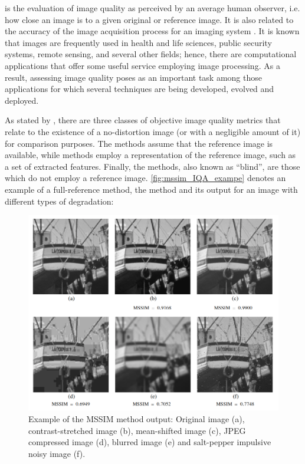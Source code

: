  is the evaluation of image quality as perceived by an average human observer, i.e. how close an image is to a given original or reference image. It is also related to the accuracy of the image acquisition process for an imaging system \cite{bovik2009essential}. It is known that images are frequently used in health and life sciences, public security systems, remote sensing, and several other fields; hence, there are computational applications that offer some useful service employing image processing. As a result, assessing image quality poses as an important task among those applications for which several techniques are being developed, evolved and deployed. 

As stated by , there are three classes of objective image quality metrics that relate to the existence of a no-distortion image (or with a negligible amount of it) for comparison purposes. The  methods assume that the reference image is available, while  methods employ a representation of the reference image, such as a set of extracted features. Finally, the  methods, also known as ``blind'', are those which do not employ a reference image. \autoref{fig:mssim_IQA_exampe} denotes an example of a full-reference method, the  method and its output for an image with different types of degradation:

\begin{figure}[htb]
	\centering
	\caption{\label{fig:mssim_IQA_exampe} Example of the MSSIM method output: Original image (a), contrast-stretched image (b), mean-shifted image (c), JPEG compressed image (d), blurred image (e) and salt-pepper impulsive noisy image (f).}
	\begin{center}
    \includegraphics[scale=0.32]{images/mssim_IQA.png}
	\end{center}
	\centering
\end{figure}

